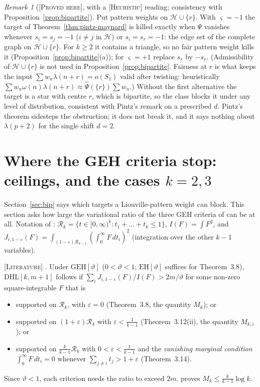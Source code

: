 \documentclass[11pt]{amsart}
\theoremstyle{definition}
\theoremstyle{remark}
\newtheorem{remark}[theorem]{Remark}
\newcommand{\lbl}[1]{\textup{\textsc{[#1]}}}
\begin{document}
\begin{remark}[\lbl{Proved here}, with a \lbl{Heuristic} reading; consistency with Proposition~\ref{prop:bipartite}]\label{rem:pintz-parity}
Put pattern weights on $\mathcal H\cup\{r\}$. With $\varsigma=-1$ the target of
Theorem~\ref{thm:pintz-maynard} is killed exactly when $\Psi$ vanishes whenever
$s_i=s_j=-1$ ($i\ne j$ in $\mathcal H$) or $s_i=s_r=-1$: the edge set of the
complete graph on $\mathcal H\cup\{r\}$. For $k\ge2$ it contains a triangle, so
no fair pattern weight kills it (Proposition~\ref{prop:bipartite}(a)); for
$\varsigma=+1$ replace $s_r$ by $-s_r$. (Admissibility of $\mathcal H\cup\{r\}$ is not used
in Proposition~\ref{prop:bipartite}. Fairness at $r$ is what keeps the input
$\sum w_n\lambda(n+r)=o(S_1)$ valid after twisting: heuristically
$\sum w_n\omega(n)\lambda(n+r)\approx\widehat\Psi(\{r\})\sum w_n$.) Without the first alternative the target
is a star with centre $r$, which is bipartite, so the class blocks it under
any level of distribution, consistent with Pintz's remark on a prescribed
$d$. Pintz's theorem sidesteps the obstruction; it does not break it, and it
says nothing about $\lambda(p+2)$ for the single shift $d=2$.
\end{remark}

\section{Where the GEH criteria stop: ceilings, and the cases \texorpdfstring{$k=2,3$}{k=2,3}}\label{sec:ceil}

Section~\ref{sec:bip} says which targets a Liouville-pattern weight can block.
This section asks how large the variational ratio of the three GEH criteria of
\cite{PM8b} can be at all. Notation of \cite{PM8b}:
$\mathcal R_k=\{t\in[0,\infty)^k:t_1+\dots+t_k\le1\}$, $I(F)=\int F^2$, and
$J_{i,1-\varepsilon}(F)=\int_{(1-\varepsilon)\mathcal R_{k-1}}
\left(\int_0^\infty F\,dt_i\right)^2$ (integration over the other $k-1$ variables).

\lbl{Literature} \cite[Theorems~3.8, 3.12, 3.14, pp.~13--16]{PM8b}. Under
$\mathrm{GEH}[\vartheta]$ ($0<\vartheta<1$; $\mathrm{EH}[\vartheta]$ suffices for Theorem~3.8), $\mathrm{DHL}[k,m+1]$ follows if
$\sum_iJ_{i,1-\varepsilon}(F)/I(F)>2m/\vartheta$ for some non-zero square-integrable
$F$ that is
\begin{itemize}
\item supported on $\mathcal R_k$, with $\varepsilon=0$ (Theorem~3.8, the quantity $M_k$); or
\item supported on $(1+\varepsilon)\mathcal R_k$ with $\varepsilon<\frac1{k-1}$
  (Theorem~3.12(ii), the quantity $M_{k,\varepsilon}$); or
\item supported on $\frac k{k-1}\mathcal R_k$ with $0<\varepsilon<\frac1{k-1}$
  and the \emph{vanishing marginal condition}
  $\int_0^\infty F\,dt_i=0$ whenever $\sum_{j\ne i}t_j>1+\varepsilon$
  (Theorem~3.14).
\end{itemize}
Since $\vartheta<1$, each criterion needs the ratio to exceed $2m$.
\cite[Corollary~6.4, p.~44]{PM8b} proves $M_k\le\frac k{k-1}\log k$.
\end{document}
